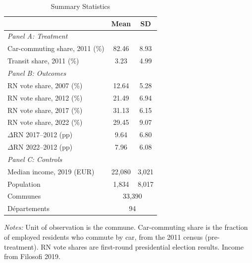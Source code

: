 \begin{table}[t]
\centering
\caption{Summary Statistics}
\label{tab:summary}
\begin{threeparttable}
\begin{tabular}{lcc}
\hline\hline
 & Mean & SD \\
\hline
\multicolumn{3}{l}{\textit{Panel A: Treatment}} \\
Car-commuting share, 2011 (\%) & 82.46 & 8.93 \\
Transit share, 2011 (\%) & 3.23 & 4.99 \\
\multicolumn{3}{l}{\textit{Panel B: Outcomes}} \\
RN vote share, 2007 (\%) & 12.64 & 5.28 \\
RN vote share, 2012 (\%) & 21.49 & 6.94 \\
RN vote share, 2017 (\%) & 31.13 & 6.15 \\
RN vote share, 2022 (\%) & 29.45 & 9.07 \\
$\Delta$RN 2017--2012 (pp) & 9.64 & 6.80 \\
$\Delta$RN 2022--2012 (pp) & 7.96 & 6.08 \\
\multicolumn{3}{l}{\textit{Panel C: Controls}} \\
Median income, 2019 (EUR) & 22,080 & 3,021 \\
Population & 1,834 & 8,017 \\
\hline
Communes & \multicolumn{2}{c}{33,390} \\
D\'{e}partements & \multicolumn{2}{c}{94} \\
\hline\hline
\end{tabular}
\begin{tablenotes}[flushleft]\small
\item \textit{Notes:} Unit of observation is the commune. Car-commuting share is the fraction of employed residents who commute by car, from the 2011 census (pre-treatment). RN vote shares are first-round presidential election results. Income from Filosofi 2019.
\end{tablenotes}
\end{threeparttable}
\end{table}

